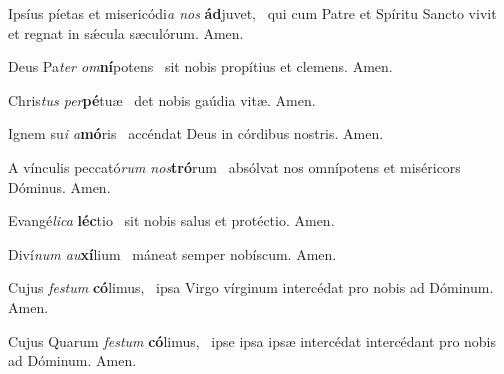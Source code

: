 \documentclass[invitatoriale-romanum.tex]{subfiles}
\begin{document}
Ipsíus píetas et misericódi\textit{a nos} \textbf{ád}juvet,~\GreSpecial{*}
qui cum Patre et Spíritu Sancto vivit et regnat in sǽcula sæculórum.
\hspace{\specialcharhsep}\rr Amen.


 Deus Pa\textit{ter om}\textbf{ní}potens~\GreSpecial{*}
sit nobis propítius et clemens.
\hspace{\specialcharhsep}\rr Amen.

 Chris\textit{tus per}\textbf{pé}tuæ~\GreSpecial{*}
det nobis gaúdia vitæ.
\hspace{\specialcharhsep}\rr Amen.

 Ignem su\textit{i a}\textbf{mó}ris~\GreSpecial{*}
accéndat Deus in córdibus nostris.
\hspace{\specialcharhsep}\rr Amen.

\pagebreak



A vínculis peccató\textit{rum nos}\textbf{tró}rum~\GreSpecial{*}
absólvat nos omnípotens et miséricors Dóminus.
\hspace{\specialcharhsep}\rr Amen.


Evangé\textit{lica} \textbf{léc}tio~\GreSpecial{*}
sit nobis salus et protéctio.
\hspace{\specialcharhsep}\rr Amen.


Diví\textit{num au}\textbf{xí}lium~\GreSpecial{*}
máneat semper nobíscum.
\hspace{\specialcharhsep}\rr Amen.


Cujus \textit{festum} \textbf{có}limus,~\GreSpecial{*}
ipsa Virgo vírginum intercédat pro nobis ad Dóminum.
\hspace{\specialcharhsep}\rr Amen.


Cujus  Quarum\rubric{)} \textit{festum} \textbf{có}limus,~\GreSpecial{*}
ipse  ipsa  ipsæ\rubric{)}
intercédat  intercédant\rubric{)} pro nobis ad Dóminum.
\hspace{\specialcharhsep}\rr Amen.
\end{document}
